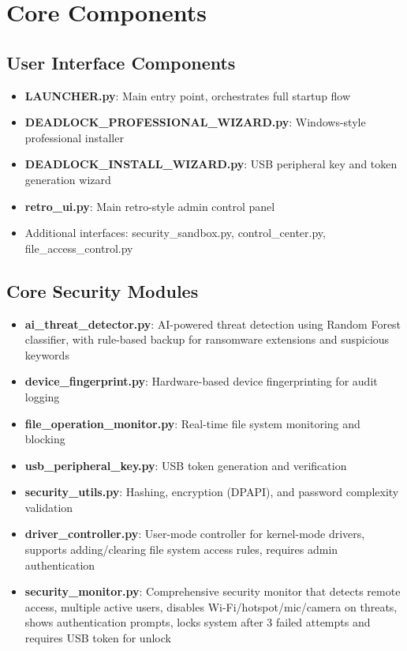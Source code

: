 \documentclass[12pt,letterpaper]{report}
\begin{document}
\section{Core Components}
\subsection{User Interface Components}
\begin{itemize}
    \item \textbf{LAUNCHER.py}: Main entry point, orchestrates full startup flow
    \item \textbf{DEADLOCK\_PROFESSIONAL\_WIZARD.py}: Windows-style professional installer
    \item \textbf{DEADLOCK\_INSTALL\_WIZARD.py}: USB peripheral key and token generation wizard
    \item \textbf{retro\_ui.py}: Main retro-style admin control panel
    \item Additional interfaces: security\_sandbox.py, control\_center.py, file\_access\_control.py
\end{itemize}

\subsection{Core Security Modules}
\begin{itemize}
    \item \textbf{ai\_threat\_detector.py}: AI-powered threat detection using Random Forest classifier, with rule-based backup for ransomware extensions and suspicious keywords
    \item \textbf{device\_fingerprint.py}: Hardware-based device fingerprinting for audit logging
    \item \textbf{file\_operation\_monitor.py}: Real-time file system monitoring and blocking
    \item \textbf{usb\_peripheral\_key.py}: USB token generation and verification
    \item \textbf{security\_utils.py}: Hashing, encryption (DPAPI), and password complexity validation
    \item \textbf{driver\_controller.py}: User-mode controller for kernel-mode drivers, supports adding/clearing file system access rules, requires admin authentication
    \item \textbf{security\_monitor.py}: Comprehensive security monitor that detects remote access, multiple active users, disables Wi-Fi/hotspot/mic/camera on threats, shows authentication prompts, locks system after 3 failed attempts and requires USB token for unlock
\end{itemize}
\end{document}
